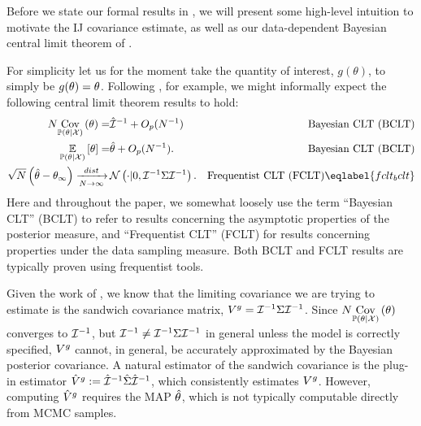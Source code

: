 Before we state our formal results in , we will present
some high-level intuition to motivate the IJ covariance estimate, as well as our
data-dependent Bayesian central limit theorem of .

For simplicity let us for the moment take the quantity of interest,
$g(\theta)$, to simply be $g(\theta) = \theta$.
%
Following \citet{kleijn:2012:bvm}, for example, we might informally expect the
following central limit theorem results to hold:
%
\begin{align}
%
N \cov{\post}{\theta} =&{} \infohat^{-1} + O_p(N^{-1})
    &\textrm{Bayesian CLT (BCLT)} \nonumber \\
\expect{\post}{\theta} =&{} \thetahat + O_p(N^{-1}).
    &\textrm{Bayesian CLT (BCLT)} \nonumber \\
\sqrt{N}\left(\thetahat - \thetatrue\right) \dlim&{}
    \normdist\left(\cdot | 0, \info^{-1} \scorecov \info^{-1} \right).
    &\textrm{Frequentist CLT (FCLT)}
    \eqlabel{fclt_bclt}
%
\end{align}
%
Here and throughout the paper, we somewhat loosely use the term ``Bayesian CLT''
(BCLT) to refer to results concerning the asymptotic properties of the posterior
measure, and ``Frequentist CLT'' (FCLT) for results concerning properties under
the data sampling measure.  Both BCLT and FCLT results are typically proven
using frequentist tools.

Given the work of \citet{kleijn:2012:bvm}, we know that the limiting covariance we
are trying to estimate is the sandwich covariance matrix, $V^g =
\mathcal{I}^{-1} \Sigma \mathcal{I}^{-1}$. Since $N \underset{\mathbb{P}(\theta | {\mathcal{X}})}{\mathrm{Cov}}\left(\theta\right)$ converges to
$\mathcal{I}^{-1}$, but $\mathcal{I}^{-1} \ne \mathcal{I}^{-1} \Sigma \mathcal{I}^{-1}$
in general unless the model is correctly specified, $V^g$ cannot,
in general, be accurately approximated by the Bayesian posterior covariance.
%
A natural estimator of the sandwich covariance is the plug-in estimator $\hat{V}^{g}
:= \hat{\mathcal{I}}^{-1} \hat\Sigma \hat{\mathcal{I}}^{-1}$, which consistently estimates
$V^g$.  However, computing $\hat{V}^{g}$ requires the MAP $\hat\theta$, which is not
typically computable directly from MCMC samples.

